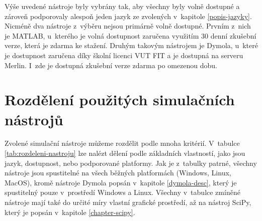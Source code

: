 Výše uvedené nástroje byly vybrány tak, aby všechny byly volně dostupné a zároveň podporovaly alespoň jeden jazyk ze zvolených v~kapitole \ref{popis-jazyky}. Nicméně dva nástroje z~výběru nejsou primárně volně dostupné. Prvním z~nich je MATLAB, u~kterého je volná dostupnost zaručena využitím 30 denní zkušební verze, která je zdarma ke stažení. Druhým takovým nástrojem je Dymola, u~které je dostupnost zaručena díky školní licenci VUT FIT a je dostupná na serveru Merlin. I~zde je dostupná zkušební verze zdarma po omezenou dobu.

\section{Rozdělení použitých simulačních nástrojů}
\label{rozdeleni-nastroju}

Zvolené simulační nástroje můžeme rozdělit podle mnoha kritérií. V~tabulce \ref{tab:rozdeleni-nastroju} lze nalézt dělení podle základních vlastností, jako jsou jazyk, dostupnost, nebo podporované platformy. Jak je z~tabulky patrné, všechny nástroje jsou spustitelné na všech běžných platformách (Windows, Linux, MacOS), kromě nástroje Dymola popsán v~kapitole \ref{dymola-desc}, který je spustitelný pouze v~prostředí Windows a Linux. Všechny v~tabulce zmíněné nástroje mají také do určité míry vlastní grafické prostředí, až na nástroj SciPy, který je popsán v~kapitole \ref{chapter-scipy}.

